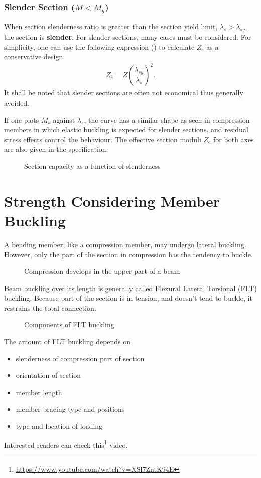 \subsubsection{Slender Section ($M<M_y$)}
When section slenderness ratio is greater than the section yield limit, $\lambda_s>\lambda_{sy}$, the section is \textbf{slender}.
For slender sections, many cases must be considered.
For simplicity, one can use the following expression () to calculate $Z_e$ as a conservative design.
\begin{gather}
Z_e=Z\left(\dfrac{\lambda_{sy}}{\lambda_s}\right)^2.
\end{gather}
It shall be noted that slender sections are often not economical thus generally avoided.

If one plots $M_s$ against $\lambda_s$, the curve has a similar shape as seen in compression members in which elastic buckling is expected for slender sections, and residual stress effects control the behaviour.
The effective section moduli $Z_e$ for both axes are also given in the specification.
\begin{figure}[H]
\centering\caption{Section capacity as a function of slenderness}
\end{figure}
\section{Strength Considering Member Buckling}
A bending member, like a compression member, may undergo lateral buckling.
However, only the part of the section in compression has the tendency to buckle.
\begin{figure}[H]
\centering
\caption{Compression develops in the upper part of a beam}
\end{figure}
Beam buckling over its length is generally called Flexural Lateral Torsional (FLT) buckling.
Because part of the section is in tension, and doesn't tend to buckle, it restrains the total connection.
\begin{figure}[H]
\centering\caption{Components of FLT buckling}
\end{figure}

The amount of FLT buckling depends on
\begin{itemize}
\item slenderness of compression part of section
\item orientation of section
\item member length
\item member bracing type and positions
\item type and location of loading
\end{itemize}
Interested readers can check \href{https://www.youtube.com/watch?v=XSl7ZntK94E}{this}\footnote{\url{https://www.youtube.com/watch?v=XSl7ZntK94E}} video.
